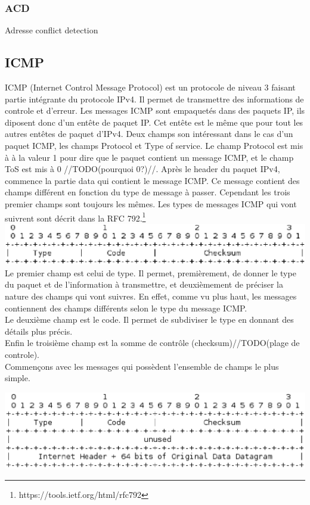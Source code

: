 \documentclass[twoside,openright,a4paper,11pt,french]{article}
\begin{document}
\subsubsection{ACD}
Adresse conflict detection
\subsection{ICMP}
ICMP (Internet Control Message Protocol) est un protocole de niveau 3 faisant partie intégrante du protocole IPv4. Il permet de transmettre des informations de controle et d'erreur. Les messages ICMP sont empaquetés dans des paquets IP, ils diposent donc d'un entête de paquet IP. Cet entête est le même que pour tout les autres entêtes de paquet d'IPv4. Deux champs son intéressant dans le cas d'un paquet ICMP, les champs Protocol et Type of service. Le champ Protocol est mis à à la valeur 1 pour dire que le paquet contient un message ICMP, et le champ ToS est mis à 0 //TODO(pourquoi 0?)//.
Après le header du paquet IPv4, commence la partie data qui contient le message ICMP. Ce message contient des champs différent en fonction du type de message à passer. Cependant les trois premier champs sont toujours les mêmes.
Les types de messages ICMP qui vont suivrent sont décrit dans la RFC 792.\footnote{https://tools.ietf.org/html/rfc792}
\\
\includegraphics[width=15cm]{./pics/header.eps}
\\Le premier champ est celui de type. Il permet, premièrement, de donner le type du paquet et de l'information à transmettre, et deuxièmement de préciser la nature des champs qui vont suivres. En effet, comme vu plus haut, les messages contiennent des champs différents selon le type du message ICMP.
\\Le deuxième champ est le code. Il permet de subdiviser le type en donnant des détails plus précis.
\\Enfin le troisième champ est la somme de contrôle (checksum)//TODO(plage de controle).
\\Commençons avec les messages qui possèdent l'ensemble de champs le plus simple.

\includegraphics[width=15cm]{./pics/header1.eps}
\end{document}
